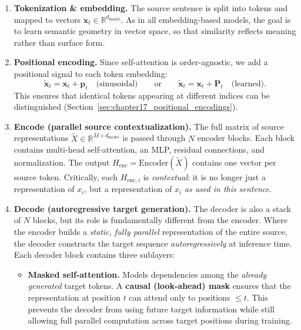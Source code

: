 \begin{enumerate}
	\item \textbf{Tokenization \& embedding.}
	The source sentence is split into tokens and mapped to vectors
	\(
	\mathbf{x}_t \in \mathbb{R}^{d_{\text{model}}}.
	\)
	As in all embedding-based models, the goal is to learn semantic geometry in vector space,
	so that similarity reflects meaning rather than surface form.
	
	\item \textbf{Positional encoding.}
	Since self-attention is order-agnostic,
	we add a positional signal to each token embedding:
	\[
	\tilde{\mathbf{x}}_t = \mathbf{x}_t + \mathbf{p}_t
	\quad
	\text{(sinusoidal)}
	\qquad
	\text{or}
	\qquad
	\tilde{\mathbf{x}}_t = \mathbf{x}_t + \mathbf{P}_t
	\quad
	\text{(learned)}.
	\]
	This ensures that identical tokens appearing at different indices can be distinguished
	(Section~\ref{sec:chapter17_positional_encodings}).
	
	\item \textbf{Encode (parallel source contextualization).}
	The full matrix of source representations
	\(
	\tilde{X} \in \mathbb{R}^{M \times d_{\text{model}}}
	\)
	is passed through \(N\) encoder blocks.
	Each block contains multi-head self-attention, an MLP, residual connections, and normalization.
	The output
	\(
	H_{\text{enc}} = \text{Encoder}(\tilde{X})
	\)
	contains one vector per source token.
	Critically, each \(H_{\text{enc},i}\) is \emph{contextual}:
	it is no longer just a representation of \(x_i\),
	but a representation of \(x_i\) \emph{as used in this sentence}.
	
	\item \textbf{Decode (autoregressive target generation).}
	The decoder is also a stack of \(N\) blocks, but its role is fundamentally different from the encoder.
	Where the encoder builds a \emph{static, fully parallel} representation of the entire source,
	the decoder constructs the target sequence \emph{autoregressively} at inference time.
	Each decoder block contains three sublayers:
	
	\begin{itemize}
		\item \textbf{Masked self-attention.}
		Models dependencies among the \emph{already generated} target tokens.
		A \textbf{causal (look-ahead) mask} ensures that the representation at position \(t\) can attend only to positions \(\le t\).
		This prevents the decoder from using future target information while still allowing full parallel computation across target positions during training.
		

\end{itemize}
\end{enumerate}
